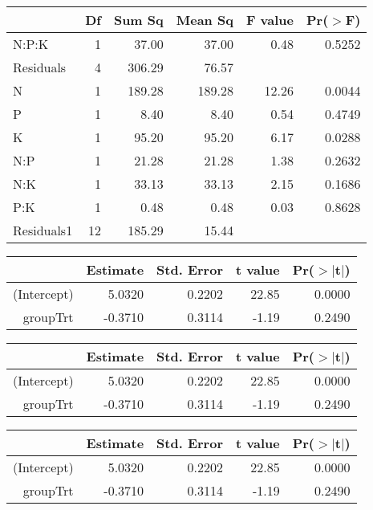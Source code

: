 \begin{table}[ht]
\centering
\begin{tabular}{lrrrrr}
  \hline
 & Df & Sum Sq & Mean Sq & F value & Pr($>$F) \\ 
  \hline
N:P:K     & 1 & 37.00 & 37.00 & 0.48 & 0.5252 \\ 
  Residuals & 4 & 306.29 & 76.57 &  &  \\ 
  N         & 1 & 189.28 & 189.28 & 12.26 & 0.0044 \\ 
  P         & 1 & 8.40 & 8.40 & 0.54 & 0.4749 \\ 
  K         & 1 & 95.20 & 95.20 & 6.17 & 0.0288 \\ 
  N:P       & 1 & 21.28 & 21.28 & 1.38 & 0.2632 \\ 
  N:K       & 1 & 33.13 & 33.13 & 2.15 & 0.1686 \\ 
  P:K       & 1 & 0.48 & 0.48 & 0.03 & 0.8628 \\ 
  Residuals1 & 12 & 185.29 & 15.44 &  &  \\ 
   \hline
\end{tabular}
\end{table}
\clearpage
\begin{table}[ht]
\begin{tabular}{rrrrr}
  \hline
 & Estimate & Std. Error & t value & Pr($>$$|$t$|$) \\ 
  \hline
(Intercept) & 5.0320 & 0.2202 & 22.85 & 0.0000 \\ 
  groupTrt & -0.3710 & 0.3114 & -1.19 & 0.2490 \\ 
   \hline
\end{tabular}
\end{table}
\begin{table}[ht]
\begin{tabular}{rrrrr}
  \hline
 & Estimate & Std. Error & t value & Pr($>$$|$t$|$) \\ 
  \hline
(Intercept) & 5.0320 & 0.2202 & 22.85 & 0.0000 \\ 
  groupTrt & -0.3710 & 0.3114 & -1.19 & 0.2490 \\ 
   \hline
\end{tabular}
\end{table}
\begin{table}[ht]
\centering
\begin{tabular}{rrrrr}
  \hline
 & Estimate & Std. Error & t value & Pr($>$$|$t$|$) \\ 
  \hline
(Intercept) & 5.0320 & 0.2202 & 22.85 & 0.0000 \\ 
  groupTrt & -0.3710 & 0.3114 & -1.19 & 0.2490 \\ 
   \hline
\end{tabular}
\end{table}
